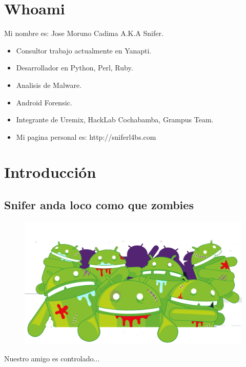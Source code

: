 \documentclass[12pt]{beamer} %
\date{AndroidCamp - Octubre  2013} %
\begin{document}
\section{Whoami}

\begin{slide}
  
   \begin{center}
       Mi nombre es: Jose Moruno Cadima A.K.A Snifer.
   \end{center}
  
  \begin{itemize}
  \item Consultor trabajo actualmente en Yanapti.\pause
  \item Desarrollador en Python, Perl, Ruby.\pause
  \item Analisis de Malware. \pause
  \item Android Forensic.\pause
  \item Integrante de Uremix, HackLab Cochabamba, Grampus Team.\pause
  \item Mi pagina personal es: http://sniferl4bs.com
  \end{itemize}
\end{slide}

\section{Introducción}

\subsection{Snifer anda loco como que zombies}

\begin{slide}
    \begin{figure}[h]
      \includegraphics[height=0.7\textheight]{img/AndroZombie.png}
    \end{figure}
    Nuestro amigo es controlado...
\end{slide}
\end{document}
